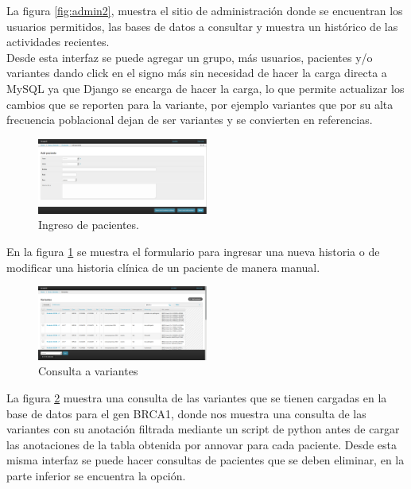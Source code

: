 La figura \ref{fig:admin2}, muestra el sitio de administración donde se encuentran los usuarios permitidos, las bases de datos a consultar y muestra un histórico de las actividades recientes. \\

Desde esta interfaz se puede agregar un grupo, más usuarios, pacientes y/o variantes dando click en el signo más sin necesidad de hacer la carga directa a MySQL ya que Django se encarga de hacer la carga, lo que permite actualizar los cambios que se reporten para la variante, por ejemplo variantes que por su alta frecuencia poblacional dejan de ser variantes y se convierten en referencias. \\

\begin{figure}[h] 
	\centering
	\includegraphics[width=0.5\textwidth]{Kap3/ingresar_paciente}
	\caption{Ingreso de pacientes.} \label{fig:pacientes}
\end{figure}

En la figura \ref{fig:pacientes} se muestra el formulario para ingresar una nueva historia o de modificar una historia clínica de un paciente de manera manual.

\begin{figure}[h] 
	\centering
	\includegraphics[width=0.5\textwidth]{Kap3/consulta}
	\caption{Consulta a variantes} \label{fig:consulta}
\end{figure}


La figura \ref{fig:consulta} muestra una consulta de las variantes que se tienen cargadas en la base de datos para el gen BRCA1, donde nos muestra una consulta de las variantes con su anotación  filtrada mediante un script de python antes de cargar las anotaciones de la tabla obtenida por annovar para cada paciente. Desde esta misma interfaz se puede hacer consultas de pacientes que se deben eliminar, en la parte inferior se encuentra la opción.\\

